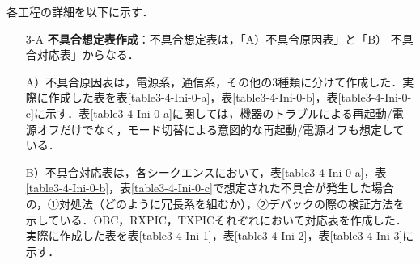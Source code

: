 各工程の詳細を以下に示す．
\begin{itemize}
	\item[3-A] \textbf{不具合想定表作成}：不具合想定表は，「A）不具合原因表」と「B） 不具合対応表」からなる．
	
	A）不具合原因表は，電源系，通信系，その他の3種類に分けて作成した．実際に作成した表を表\ref{table3-4-Ini-0-a}，表\ref{table3-4-Ini-0-b}，表\ref{table3-4-Ini-0-c}に示す．表\ref{table3-4-Ini-0-a}に関しては，機器のトラブルによる再起動/電源オフだけでなく，モード切替による意図的な再起動/電源オフも想定している．
	
	B）不具合対応表は，各シークエンスにおいて，表\ref{table3-4-Ini-0-a}，表\ref{table3-4-Ini-0-b}，表\ref{table3-4-Ini-0-c}で想定された不具合が発生した場合の，①対処法（どのように冗長系を組むか），②デバックの際の検証方法を示している．OBC，RXPIC，TXPICそれぞれにおいて対応表を作成した．実際に作成した表を表\ref{table3-4-Ini-1}，表\ref{table3-4-Ini-2}，表\ref{table3-4-Ini-3}に示す．
	

\end{itemize}
